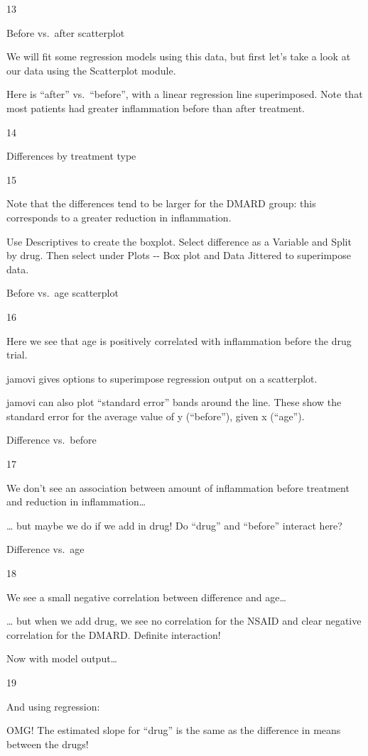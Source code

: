 \documentclass[
  letterpaper,
  DIV=11,
  numbers=noendperiod]{scrreprt}
\begin{document}
13

Before vs.~after scatterplot

We will fit some regression models using this data, but first let's take
a look at our data using the Scatterplot module.

Here is ``after'' vs.~``before'', with a linear regression line
superimposed. Note that most patients had greater inflammation before
than after treatment.

14

Differences by treatment type

15

Note that the differences tend to be larger for the DMARD group: this
corresponds to a greater reduction in inflammation.

Use Descriptives to create the boxplot. Select difference as a Variable
and Split by drug. Then select under Plots -\/- Box plot and Data
Jittered to superimpose data.

Before vs.~age scatterplot

16

Here we see that age is positively correlated with inflammation before
the drug trial.

jamovi gives options to superimpose regression output on a scatterplot.

jamovi can also plot ``standard error'' bands around the line. These
show the standard error for the average value of y (``before''), given x
(``age'').

Difference vs.~before

17

We don't see an association between amount of inflammation before
treatment and reduction in inflammation\ldots{}

\ldots{} but maybe we do if we add in drug! Do ``drug'' and ``before''
interact here?

Difference vs.~age

18

We see a small negative correlation between difference and age\ldots{}

\ldots{} but when we add drug, we see no correlation for the NSAID and
clear negative correlation for the DMARD. Definite interaction!

Now with model output\ldots{}

19



And using regression:

OMG! The estimated slope for ``drug'' is the same as the difference in
means between the drugs!
\end{document}

